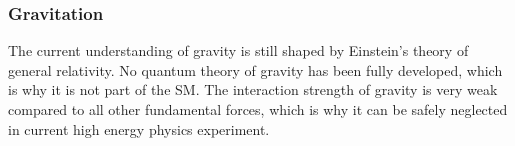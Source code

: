 
\subsubsection{Gravitation}
The current understanding of gravity is still shaped by Einstein's theory of general relativity. No quantum theory of gravity has been fully developed, which is why it is not part of the SM. 
The interaction strength of gravity is very weak compared to all other fundamental forces, which is why it can be safely neglected in current high energy physics experiment.







